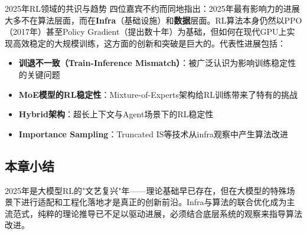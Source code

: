 \begin{knowledgebox}{2025年RL领域的共识与趋势}
四位嘉宾不约而同地指出：2025年最有影响力的进展大多不在算法层面，而在\textbf{Infra}（基础设施）和\textbf{数据}层面。RL算法本身仍然以PPO（2017年）甚至Policy Gradient（提出数十年）为基础，但如何在现代GPU上实现高效稳定的大规模训练，这方面的创新和突破是巨大的。代表性进展包括：
\begin{itemize}
    \item \textbf{训退不一致（Train-Inference Mismatch）}：被广泛认识为影响训练稳定性的关键问题
    \item \textbf{MoE模型的RL稳定性}：Mixture-of-Experts架构给RL训练带来了特有的挑战
    \item \textbf{Hybrid架构}：超长上下文与Agent场景下的RL稳定性
    \item \textbf{Importance Sampling}：Truncated IS等技术从infra观察中产生算法改进
\end{itemize}
\end{knowledgebox}

\subsection{本章小结}

2025年是大模型RL的"文艺复兴"年——理论基础早已存在，但在大模型的特殊场景下进行适配和工程化落地才是真正的创新前沿。Infra与算法的联合优化成为主流范式，纯粹的理论推导已不足以驱动进展，必须结合底层系统的观察来指导算法改进。


